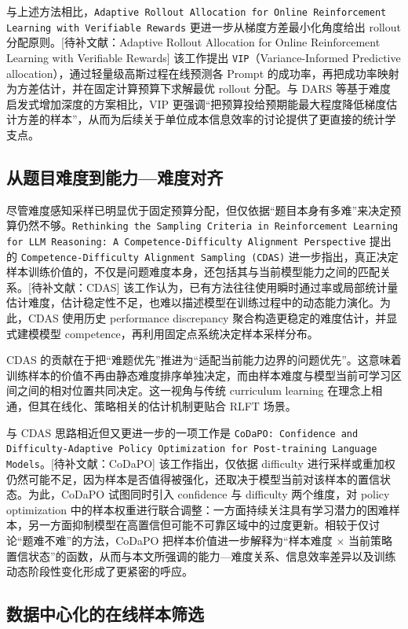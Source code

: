 与上述方法相比，\texttt{Adaptive Rollout Allocation for Online Reinforcement Learning with Verifiable Rewards} 更进一步从梯度方差最小化角度给出 rollout 分配原则。[待补文献：Adaptive Rollout Allocation for Online Reinforcement Learning with Verifiable Rewards] 该工作提出 \texttt{VIP}（Variance-Informed Predictive allocation），通过轻量级高斯过程在线预测各 Prompt 的成功率，再把成功率映射为方差估计，并在固定计算预算下求解最优 rollout 分配。与 DARS 等基于难度启发式增加深度的方案相比，VIP 更强调“把预算投给预期能最大程度降低梯度估计方差的样本”，从而为后续关于单位成本信息效率的讨论提供了更直接的统计学支点。

\subsection{从题目难度到能力—难度对齐}

尽管难度感知采样已明显优于固定预算分配，但仅依据“题目本身有多难”来决定预算仍然不够。\texttt{Rethinking the Sampling Criteria in Reinforcement Learning for LLM Reasoning: A Competence-Difficulty Alignment Perspective} 提出的 \texttt{Competence-Difficulty Alignment Sampling (CDAS)} 进一步指出，真正决定样本训练价值的，不仅是问题难度本身，还包括其与当前模型能力之间的匹配关系。[待补文献：CDAS] 该工作认为，已有方法往往使用瞬时通过率或局部统计量估计难度，估计稳定性不足，也难以描述模型在训练过程中的动态能力演化。为此，CDAS 使用历史 performance discrepancy 聚合构造更稳定的难度估计，并显式建模模型 competence，再利用固定点系统决定样本采样分布。

CDAS 的贡献在于把“难题优先”推进为“适配当前能力边界的问题优先”。这意味着训练样本的价值不再由静态难度排序单独决定，而由样本难度与模型当前可学习区间之间的相对位置共同决定。这一视角与传统 curriculum learning 在理念上相通，但其在线化、策略相关的估计机制更贴合 RLFT 场景。

与 CDAS 思路相近但又更进一步的一项工作是 \texttt{CoDaPO: Confidence and Difficulty-Adaptive Policy Optimization for Post-training Language Models}。[待补文献：CoDaPO] 该工作指出，仅依据 difficulty 进行采样或重加权仍然可能不足，因为样本是否值得被强化，还取决于模型当前对该样本的置信状态。为此，CoDaPO 试图同时引入 confidence 与 difficulty 两个维度，对 policy optimization 中的样本权重进行联合调整：一方面持续关注具有学习潜力的困难样本，另一方面抑制模型在高置信但可能不可靠区域中的过度更新。相较于仅讨论“题难不难”的方法，CoDaPO 把样本价值进一步解释为“样本难度 × 当前策略置信状态”的函数，从而与本文所强调的能力—难度关系、信息效率差异以及训练动态阶段性变化形成了更紧密的呼应。

\subsection{数据中心化的在线样本筛选}

